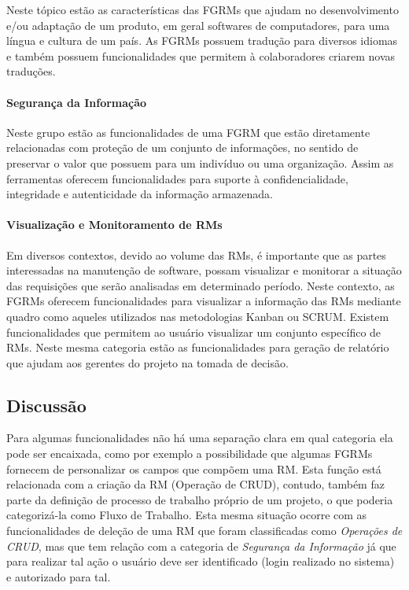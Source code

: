 Neste tópico estão as características das FGRMs que ajudam no desenvolvimento
e/ou adaptação de um produto, em geral softwares de computadores, para uma
língua e cultura de um país. As FGRMs possuem tradução para diversos idiomas e
também possuem funcionalidades que permitem à colaboradores criarem novas
traduções.

\paragraph{Segurança da Informação}
\label{par:segurança_da_informação}

Neste grupo estão as funcionalidades de uma FGRM que estão diretamente
relacionadas com proteção de um conjunto de informações, no sentido de preservar
o valor que possuem para um indivíduo ou uma organização. Assim as ferramentas
oferecem funcionalidades para suporte à confidencialidade, integridade e
autenticidade da informação armazenada.

\paragraph{Visualização e Monitoramento de RMs}
\label{par:visualização_de_rm_s}

Em diversos contextos, devido ao volume das RMs, é importante que as partes
interessadas na manutenção de software, possam visualizar e monitorar a situação
das requisições que serão analisadas em determinado período. Neste contexto, as
FGRMs oferecem funcionalidades para visualizar a informação das RMs mediante
quadro como aqueles utilizados nas metodologias Kanban ou SCRUM\@. Existem
funcionalidades que permitem ao usuário visualizar um conjunto específico de
RMs. Neste mesma categoria estão as funcionalidades para geração de relatório
que ajudam aos gerentes do projeto na tomada de decisão.

\subsection{Discussão}
\label{sec:discussao}

Para algumas funcionalidades não há uma separação clara em qual categoria ela
pode ser encaixada, como por exemplo a possibilidade que algumas FGRMs fornecem
de personalizar os campos que compõem uma RM\@. Esta função está relacionada com
a criação da RM (Operação de CRUD), contudo, também faz parte da definição de
processo de trabalho próprio de um projeto, o que poderia categorizá-la como
Fluxo de Trabalho. Esta mesma situação ocorre com as funcionalidades de deleção
de uma RM que foram classificadas como \textit{Operações de CRUD}, mas que tem
relação com a categoria de \textit{Segurança da Informação} já que para realizar
tal ação o usuário deve ser identificado (login realizado no sistema) e
autorizado para tal.


